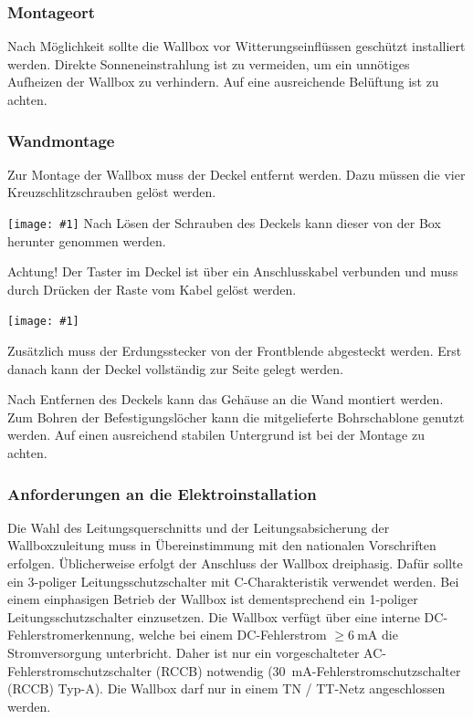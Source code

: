\documentclass[a4paper,10pt]{article}
\newcommand{\hint}[1]{\begin{tcolorbox}[colback=boxgray,colframe=black,coltext=
white,title=Hinweis]#1\end{tcolorbox}}
\newcommand{\gfx}[1]{\texttt{[image: \#1]}}
\begin{document}
\begin{multicols*}{2}
	\subsubsection{Montageort}
	Nach Möglichkeit sollte die Wallbox vor Witterungseinflüssen geschützt
	installiert werden. Direkte Sonneneinstrahlung ist zu vermeiden, um ein
	unnötiges Aufheizen der Wallbox zu verhindern. Auf eine ausreichende Belüftung
	ist zu achten.

	\subsubsection{Wandmontage}\label{wandmontage}
	Zur Montage der Wallbox muss der Deckel entfernt werden. Dazu müssen die
	vier Kreuzschlitzschrauben gelöst werden.

	\gfx{./img_warp2/resized/warp_screw_points_ready}
	Nach Lösen der Schrauben des Deckels kann dieser von der Box herunter genommen
	werden.

	\hint{Achtung! Der Taster im Deckel ist über ein Anschlusskabel verbunden und muss
		durch Drücken der Raste vom Kabel gelöst werden.}

	\gfx{./img_warp2/resized/warp2_button_and_gnd_600}


	Zusätzlich muss der Erdungsstecker von der Frontblende abgesteckt werden.
	Erst danach kann der Deckel vollständig zur Seite gelegt werden.


	Nach Entfernen des Deckels kann das Gehäuse an die Wand montiert werden. Zum
	Bohren der Befestigungslöcher kann die mitgelieferte Bohrschablone genutzt
	werden. Auf einen ausreichend stabilen Untergrund ist bei der Montage zu
	achten.

	\subsubsection{Anforderungen an die Elektroinstallation}
	Die Wahl des Leitungsquerschnitts und der Leitungsabsicherung der
	Wallboxzuleitung muss in Übereinstimmung mit den nationalen Vorschriften
	erfolgen. Üblicherweise erfolgt der Anschluss der Wallbox dreiphasig.
	Dafür sollte ein 3-poliger Leitungsschutzschalter mit C-Charakteristik
	verwendet werden. Bei einem einphasigen Betrieb der Wallbox ist
	dementsprechend ein 1-poliger Leitungsschutzschalter einzusetzen.
	Die Wallbox verfügt über eine interne DC-Fehlerstromerkennung, welche
	bei einem DC-Fehlerstrom $\geq \SI{6}{\milli\ampere}$ die Stromversorgung
	unterbricht. Daher ist nur ein vorgeschalteter AC-Fehlerstromschutzschalter
	(RCCB) notwendig (\SI{30}{\milli\ampere}-Fehlerstromschutzschalter (RCCB) Typ-A).
	Die Wallbox darf nur in einem TN / TT-Netz angeschlossen werden.


\end{multicols*}
\end{document}
